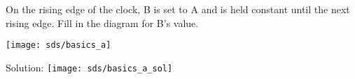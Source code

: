 \begin{blocksection}
\question
On the rising edge of the clock, B is set to A and is held constant until the next rising edge.  Fill in the diagram for B’s value.

\texttt{[image: sds/basics\_a]}
\begin{solution}
Solution:
\texttt{[image: sds/basics\_a\_sol]}
\end{solution}

\end{blocksection}